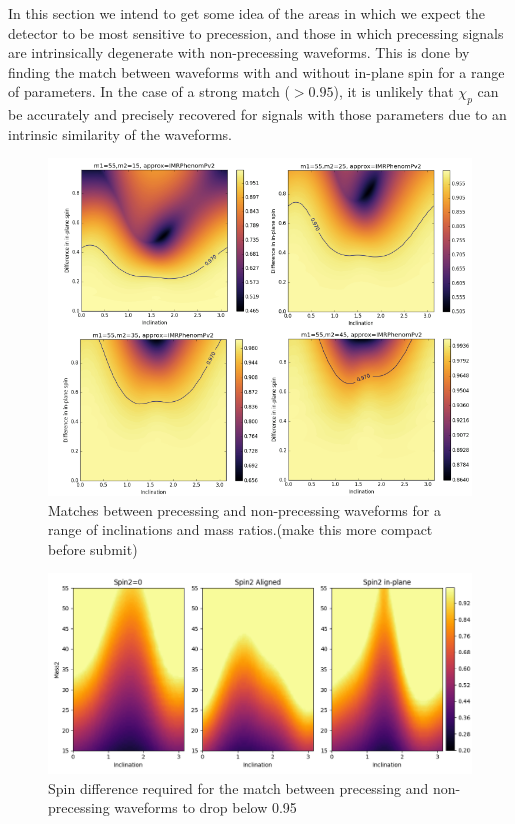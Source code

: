 \documentclass[11pt]{article}
\begin{document}
In this section we intend to get some idea of the areas in which we expect the detector to be most sensitive to precession, and those in which precessing signals are intrinsically degenerate with non-precessing waveforms. This is done by finding the match between waveforms with and without in-plane spin for a range of parameters. In the case of a strong match ($>0.95$), it is unlikely that $\chi_p$ can be accurately and precisely recovered for signals with those parameters due to an intrinsic similarity of the waveforms.

\begin{figure}
	\includegraphics[width=1\textwidth]{fig10.png}
	\centering
	\caption{Matches between precessing and non-precessing waveforms for a range of inclinations and mass ratios.(make this more compact before submit)}
	\centering
\end{figure}
\begin{figure}
	\includegraphics[width=1\textwidth]{fig11.png}
	\centering
	\caption{Spin difference required for the match between precessing and non-precessing waveforms to drop below 0.95}
	\centering
\end{figure}
\end{document}
